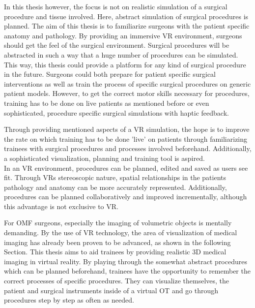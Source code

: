 In this thesis however, the focus is not on realistic simulation of a surgical procedure and tissue involved.
Here, abstract simulation of surgical procedures is planned.
The aim of this thesis is to familiarize surgeons with the patient specific anatomy and pathology.
By providing an immersive VR environment, surgeons should get the feel of the surgical environment.
Surgical procedures will be abstracted in such a way that a huge number of procedures can be simulated.
This way, this thesis could provide a platform for any kind of surgical procedure in the future. 
Surgeons could both prepare for patient specific surgical interventions as well as train the process of specific surgical procedures on generic patient models.  
However, to get the correct motor skills necessary for procedures, training has to be done on live patients as mentioned before or even sophisticated, procedure specific surgical simulations with haptic feedback.

Through providing mentioned aspects of a VR simulation, the hope is to improve the rate on which training has to be done 'live' on patients through familiarizing trainees with surgical procedures and processes involved beforehand.
Additionally, a sophisticated visualization, planning and training tool is aspired.
\\ In an VR environment, procedures can be planned, edited and saved as users see fit.
Through VRs stereoscopic nature, spatial relationships in the patients pathology and anatomy can be more accurately represented.
Additionally, procedures can be planned collaboratively and improved incrementally, although this advantage is not exclusive to VR.

For OMF surgeons, especially the imaging of volumetric objects is mentally demanding. 
By the use of VR technology, the area of visualization of medical imaging has already been proven to be advanced, as shown in the following Section.
This thesis aims to aid trainees by providing realistic 3D medical imaging in virtual reality.
By playing through the somewhat abstract procedures which can be planned beforehand, trainees have the opportunity to remember the correct processes of specific procedures.
They can visualize themselves, the patient and surgical instruments inside of a virtual OT and go through procedures step by step as often as needed.